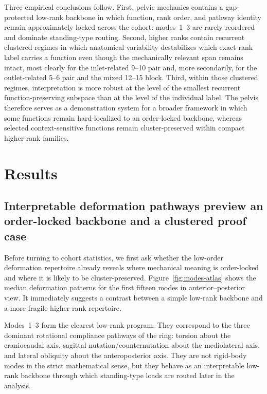 \documentclass[11pt]{article}
\begin{document}
Three empirical conclusions follow.
First, pelvic mechanics contains a gap-protected low-rank backbone in which function, rank order, and pathway identity remain approximately locked across the cohort: modes~1--3 are rarely reordered and dominate standing-type routing.
Second, higher ranks contain recurrent clustered regimes in which anatomical variability destabilizes which exact rank label carries a function even though the mechanically relevant span remains intact, most clearly for the inlet-related 9--10 pair and, more secondarily, for the outlet-related 5--6 pair and the mixed 12--15 block.
Third, within those clustered regimes, interpretation is more robust at the level of the smallest recurrent function-preserving subspace than at the level of the individual label.
The pelvis therefore serves as a demonstration system for a broader framework in which some functions remain hard-localized to an order-locked backbone, whereas selected context-sensitive functions remain cluster-preserved within compact higher-rank families.

\section{Results}
\label{sec:results}

\subsection{Interpretable deformation pathways preview an order-locked backbone and a clustered proof case}
\label{sec:atlas-results}

Before turning to cohort statistics, we first ask whether the low-order deformation repertoire already reveals where mechanical meaning is order-locked and where it is likely to be cluster-preserved.
Figure~\ref{fig:modes-atlas} shows the median deformation patterns for the first fifteen modes in anterior--posterior view.
It immediately suggests a contrast between a simple low-rank backbone and a more fragile higher-rank repertoire.

Modes~1--3 form the clearest low-rank program.
They correspond to the three dominant rotational compliance pathways of the ring: torsion about the craniocaudal axis, sagittal nutation/counternutation about the mediolateral axis, and lateral obliquity about the anteroposterior axis.
They are not rigid-body modes in the strict mathematical sense, but they behave as an interpretable low-rank backbone through which standing-type loads are routed later in the analysis.
\end{document}
